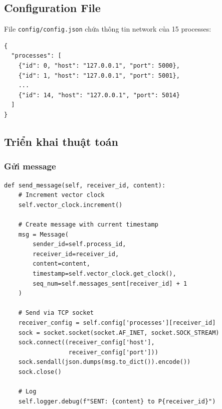 \subsection{Configuration File}

File \texttt{config/config.json} chứa thông tin network của 15 processes:

\begin{listing}[H]
\begin{verbatim}
{
  "processes": [
    {"id": 0, "host": "127.0.0.1", "port": 5000},
    {"id": 1, "host": "127.0.0.1", "port": 5001},
    ...
    {"id": 14, "host": "127.0.0.1", "port": 5014}
  ]
}
\end{verbatim}
\caption{Configuration Example}
\end{listing}

\subsection{Triển khai thuật toán}

\subsubsection{Gửi message}

\begin{listing}[H]
\begin{verbatim}
def send_message(self, receiver_id, content):
    # Increment vector clock
    self.vector_clock.increment()
    
    # Create message with current timestamp
    msg = Message(
        sender_id=self.process_id,
        receiver_id=receiver_id,
        content=content,
        timestamp=self.vector_clock.get_clock(),
        seq_num=self.messages_sent[receiver_id] + 1
    )
    
    # Send via TCP socket
    receiver_config = self.config['processes'][receiver_id]
    sock = socket.socket(socket.AF_INET, socket.SOCK_STREAM)
    sock.connect((receiver_config['host'], 
                  receiver_config['port']))
    sock.sendall(json.dumps(msg.to_dict()).encode())
    sock.close()
    
    # Log
    self.logger.debug(f"SENT: {content} to P{receiver_id}")
\end{verbatim}
\caption{Send Message Implementation}
\end{listing}

